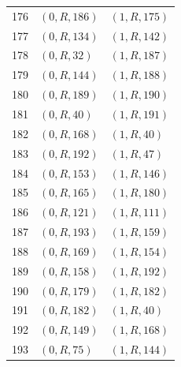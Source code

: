 \begin{longtable}{rll}
176 & $(0,R,186)$ & $(1,R,175)$ \\
177 & $(0,R,134)$ & $(1,R,142)$ \\
178 & $(0,R,32)$ & $(1,R,187)$ \\
179 & $(0,R,144)$ & $(1,R,188)$ \\
180 & $(0,R,189)$ & $(1,R,190)$ \\
181 & $(0,R,40)$ & $(1,R,191)$ \\
182 & $(0,R,168)$ & $(1,R,40)$ \\
183 & $(0,R,192)$ & $(1,R,47)$ \\
184 & $(0,R,153)$ & $(1,R,146)$ \\
185 & $(0,R,165)$ & $(1,R,180)$ \\
186 & $(0,R,121)$ & $(1,R,111)$ \\
187 & $(0,R,193)$ & $(1,R,159)$ \\
188 & $(0,R,169)$ & $(1,R,154)$ \\
189 & $(0,R,158)$ & $(1,R,192)$ \\
190 & $(0,R,179)$ & $(1,R,182)$ \\
191 & $(0,R,182)$ & $(1,R,40)$ \\
192 & $(0,R,149)$ & $(1,R,168)$ \\
193 & $(0,R,75)$ & $(1,R,144)$ \\
\bottomrule
\end{longtable}
\normalsize
